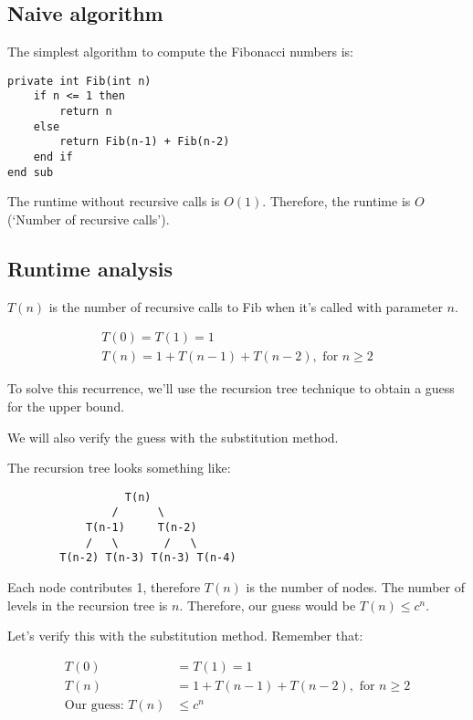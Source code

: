\documentclass[11pt,a4paper,titlepage,dvipsnames,cmyk]{scrartcl}
\begin{document}
\subsection{Naive algorithm}%
\label{sub:Naive algorithm}
The simplest algorithm to compute the Fibonacci numbers is:

\begin{lstlisting}
private int Fib(int n)
    if n <= 1 then
        return n
    else
        return Fib(n-1) + Fib(n-2)
    end if
end sub
\end{lstlisting}

The runtime without recursive calls is $O(1)$. Therefore, the runtime is
$O$(`Number of recursive calls').

\subsection{Runtime analysis}%
\label{sub:Runtime analysis}
$T(n)$ is the number of recursive calls to Fib when it's called with
parameter $n$.

\begin{align*}
    T(0) = T(1) = 1 \\
    T(n) = 1 + T(n-1) + T(n-2), \text{ for } n \ge 2
\end{align*}

To solve this recurrence, we'll use the recursion tree technique to obtain
a guess for the upper bound.

We will also verify the guess with the substitution method.

The recursion tree looks something like:

\begin{lstlisting}
                  T(n)
                /      \
            T(n-1)     T(n-2)
            /   \       /   \
        T(n-2) T(n-3) T(n-3) T(n-4)
\end{lstlisting}


Each node contributes 1, therefore $T(n)$ is the number of nodes. The
number of levels in the recursion tree is $n$. Therefore, our guess would
be $T(n) \le c^n$.

Let's verify this with the substitution method. Remember that:

\begin{align*}
    T(0) &= T(1) = 1 \\
    T(n) &= 1 + T(n-1) + T(n-2), \text{ for } n \ge 2 \\
    \text{Our guess: } T(n) &\le c^n
\end{align*}
\end{document}
